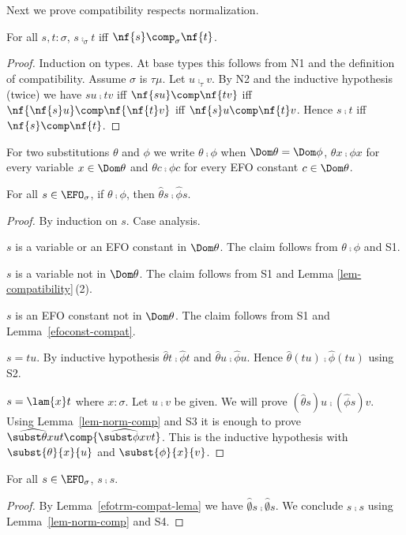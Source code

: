 Next we prove compatibility respects normalization.
\begin{lem}\label{lem-norm-comp}
  For all $s,t:\sigma$, $s\comp_\sigma t$ iff $\nf{s}\comp_\sigma\nf{t}$.
\end{lem}
\begin{proof}
  Induction on types.  At base types this follows from N1 and the definition of compatibility.
  Assume $\sigma$ is $\tau\mu$.  Let $u\comp_\tau v$.
  By N2 and the inductive hypothesis (twice) we have
  $su\comp tv$ iff $\nf{su}\comp \nf{tv}$
  iff $\nf{\nf{s}u}\comp \nf{\nf{t}v}$
  iff
  $\nf{s}u\comp \nf{t}v$.
  Hence $s\comp t$ iff $\nf{s}\comp\nf{t}$.
\end{proof}

For two substitutions $\theta$ and $\phi$
we write \emph{$\theta \comp \phi$} when
$\Dom\theta = \Dom\phi$,
$\theta x \comp \phi x$ for every variable $x\in\Dom\theta$
and
$\theta c \comp \phi c$ for every EFO constant $c\in\Dom\theta$.

\begin{lem}
  \label{efotrm-compat-lema}
  For all $s\in\EFO_\sigma$, if $\theta\comp \phi$,
  then $\hat\theta s \comp \hat\phi s$.
\end{lem}
\begin{proof}
  By induction on $s$.  Case analysis.

  \br $s$ is a variable or an EFO constant in $\Dom\theta$.
  The claim follows from $\theta\comp \phi$ and S1.

  \br $s$ is a variable not in $\Dom\theta$.
  The claim follows from S1 and Lemma \ref{lem-compatibility}\,(2).

  \br $s$ is an EFO constant not in $\Dom\theta$.
  The claim follows from S1 and Lemma~\ref{efoconst-compat}.
  
  \br $s=tu$.  By inductive hypothesis $\hat\theta t \comp \hat\phi t$ and $\hat\theta u \comp \hat\phi u$.
  Hence $\hat\theta (tu) \comp \hat\phi (tu)$ using S2.

  \br $s=\lam{x}t$ where $x:\sigma$.  Let $u\comp v$ be given.  We will prove $(\hat\theta s)u\comp (\hat\phi s)v$.
  Using Lemma~\ref{lem-norm-comp} and S3 it is enough to prove
  ${\widehat{\subst\theta{x}{u}}t}\comp{\widehat{\subst\phi{x}{v}}t}$.
  This is the inductive hypothesis with $\subst{\theta}{x}{u}$ and $\subst{\phi}{x}{v}$.
\end{proof}

\begin{lem}
  \label{efotrm-compat-lemb}
  For all $s\in\EFO_\sigma$, $s\comp s$.
\end{lem}
\begin{proof}
  By Lemma~\ref{efotrm-compat-lema} we have
  $\hat{\emptyset}{s}\comp\hat{\emptyset}{s}$.
  We conclude $s\comp s$
  using Lemma~\ref{lem-norm-comp} and S4.
\end{proof}

